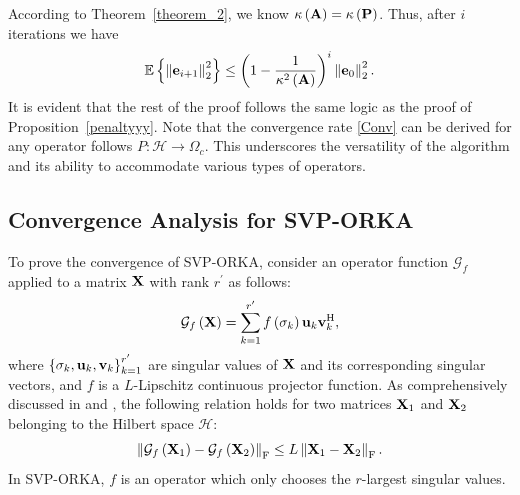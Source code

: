 \documentclass[12pt,draftcls,onecolumn]{IEEEtran}
\begin{document}
According to Theorem~\ref{theorem_2}, we know $\kappa\left(\mathbf{A}\right)=\kappa\left(\mathbf{P}\right)$. Thus, after $i$ iterations we have
\begin{equation}
\label{Conv}
\mathbb{E}\left\{\left\|\mathbf{e}_{i+1}\right\|^2_2\right\}\leq\left(1-\frac{1}{\kappa^{2}\left(\mbA\right)}\right)^{i} \left\|\mbe_0\right\|^2_2.
\end{equation}
It is evident that the rest of the proof follows the same logic as the proof of Proposition~\ref{penaltyyy}.
Note that the convergence rate \eqref{Conv} can be derived for any operator follows $P:\mathcal{H}\rightarrow\Omega_c$. This underscores the versatility of the algorithm and its ability to accommodate various types of operators.

\subsection{Convergence Analysis for SVP-ORKA}
\label{svp_proof}
To prove the convergence of SVP-ORKA, %
consider an operator function $\mathcal{G}_f$ applied to a matrix $\mathbf{X}$ with rank $r^{\prime}$ as follows:
\begin{equation}
\label{kvm_34}
\mathcal{G}_f\left(\mbX\right)=\sum^{r^{\prime}}_{k=1} f\left(\sigma_k\right)\mbu_k\mbv^{\mathrm{H}}_k,
\end{equation}
where $\left\{\sigma_k, \mathbf{u}_k, \mathbf{v}_k\right\}^{r^{\prime}}_{k=1}$ are singular values of $\mathbf{X}$ and its corresponding singular 
vectors, and $f$ is a $L$-Lipschitz continuous projector function. %
As comprehensively discussed in \cite{carlsson2021lipschitz} and \cite[Theorem~4.2]{andersson2016operator}, the following relation holds for two matrices $\mathbf{X}_1$ and $\mathbf{X}_2$ belonging to the Hilbert space $\mathcal{H}$:
\begin{equation}
\label{Lip1}
\left\|\mathcal{G}_f\left(\mbX_1\right)-\mathcal{G}_f\left(\mbX_2\right)\right\|_{\mathrm{F}} \leq L \left\|\mbX_1-\mbX_2\right\|_{\mathrm{F}}.
\end{equation}
In %
SVP-ORKA, $f$ %
is an operator which only chooses the $r$-largest singular values. 
\end{document}
